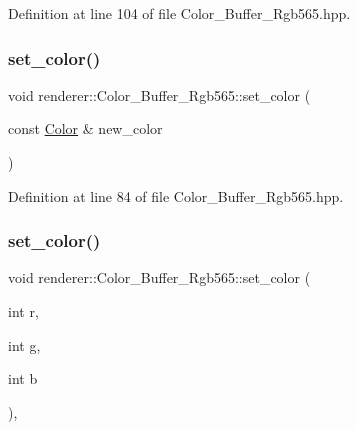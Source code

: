 Definition at line 104 of file Color\+\_\+\+Buffer\+\_\+\+Rgb565.\+hpp.

\mbox{\label{classrenderer_1_1_color___buffer___rgb565_aab74559163ff67f50416f5dc5a85bc97}} 
\subsubsection{\texorpdfstring{set\_color()}{set\_color()}\hspace{0.1cm}{\footnotesize\ttfamily [1/2]}}
{\footnotesize\ttfamily void renderer\+::\+Color\+\_\+\+Buffer\+\_\+\+Rgb565\+::set\+\_\+color (\begin{DoxyParamCaption}\item[{const \mbox{\hyperlink{structrenderer_1_1_color___buffer___rgb565_1_1_color}{Color}} \&}]{new\+\_\+color }\end{DoxyParamCaption})\hspace{0.3cm}{\ttfamily [inline]}}



Definition at line 84 of file Color\+\_\+\+Buffer\+\_\+\+Rgb565.\+hpp.

\mbox{\label{classrenderer_1_1_color___buffer___rgb565_aad9ed69a24b11f14f7efb6fc81bd82e7}} 
\subsubsection{\texorpdfstring{set\_color()}{set\_color()}\hspace{0.1cm}{\footnotesize\ttfamily [2/2]}}
{\footnotesize\ttfamily void renderer\+::\+Color\+\_\+\+Buffer\+\_\+\+Rgb565\+::set\+\_\+color (\begin{DoxyParamCaption}\item[{int}]{r,  }\item[{int}]{g,  }\item[{int}]{b }\end{DoxyParamCaption})\hspace{0.3cm}{\ttfamily [inline]}, {\ttfamily [virtual]}}



